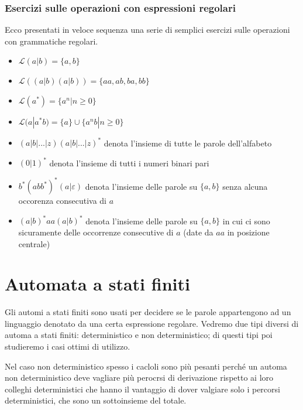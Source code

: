 \documentclass[class=book, crop=false, oneside, 12pt]{standalone}
\begin{document}
\subsubsection{Esercizi sulle operazioni con espressioni regolari}
Ecco presentati in veloce sequenza una serie di semplici esercizi sulle operazioni con grammatiche regolari. 
\begin{itemize}
    \item \(\mathcal{L}(a | b) = \{a, b\}\)
    \item \(\mathcal{L}((a | b) (a | b)) = \{aa, ab, ba, bb\}\)
    \item \(\mathcal{L}(a^*) = \{a^n | n \ge 0\}\)
    \item \(\mathcal{L}(a | a^* b) = \{a\} \cup \{a^n b | n \ge 0\}\)
    \item \( (a|b|...|z)(a|b|...|z)^* \) denota l’insieme di tutte le parole dell’alfabeto
    \item \( (0|1)^* \) denota l’insieme di tutti i numeri binari pari
    \item \( b^*( abb^* )^* ( a | \varepsilon ) \) denota l’insieme delle parole su \(\{a,b\} \) senza alcuna occorenza consecutiva di \(a\)
    \item \( (a|b)^* aa(a|b)^* \) denota l’insieme delle parole su \( \{a,b\} \) in cui ci sono sicuramente delle occorrenze consecutive di \(a\) (date da \(aa\) in posizione centrale)
\end{itemize}


\section{Automata a stati finiti}
Gli automi a stati finiti sono usati per decidere se le parole appartengono ad un linguaggio denotato da una certa espressione regolare.
Vedremo due tipi diversi di automa a stati finiti: deterministico e non deterministico; di questi tipi poi studieremo i casi ottimi di utilizzo.

Nel caso non deterministico spesso i cacloli sono più pesanti perché un automa non deterministico deve vagliare più perocrsi di derivazione rispetto ai loro colleghi deterministici che hanno il vantaggio di dover valgiare solo i percorsi deterministici, che sono un sottoinsieme del totale.
\end{document}
